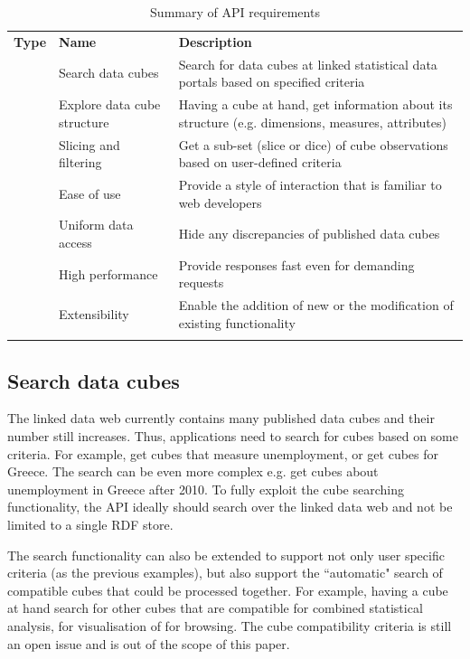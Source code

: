 \documentclass{llncs}
\begin{document}
\begin{table}
\caption{Summary of API requirements}
\begin{tabular}{p{2cm}p{4cm}p{5.9cm}}
\hline\noalign{\smallskip}
\textbf{Type} & \textbf{Name} & \textbf{Description}\\
\noalign{\smallskip}
\hline
\noalign{\smallskip}
\multirow{3}{*}{functional} & Search data cubes & Search for data cubes at linked statistical data portals based on specified criteria\\\noalign{\smallskip}
 & Explore data cube structure & Having a cube at hand, get information about its structure (e.g. dimensions, measures, attributes)\\\noalign{\smallskip}
 & Slicing and filtering & Get a sub-set (slice or dice) of cube observations based on user-defined criteria\\\noalign{\smallskip}\hline
\multirow{4}{*}{non-functional} & Ease of use & Provide a style of interaction that is familiar to web developers\\\noalign{\smallskip}
 & Uniform data access & Hide any discrepancies of published data cubes\\\noalign{\smallskip}
 & High performance & Provide responses fast even for demanding requests\\\noalign{\smallskip}
 & Extensibility & Enable the addition of new or the modification of existing functionality\\\noalign{\smallskip}
\hline
\end{tabular}
\label{tbl:req}
\end{table}

\subsection{Search data cubes}\label{sec:search}

The linked data web currently contains many published data cubes and their number still increases. Thus, applications need to search for cubes based on some criteria. For example, get cubes that measure unemployment, or get cubes for Greece. The search can be even more complex e.g. get cubes about unemployment in Greece after 2010. To fully exploit the cube searching functionality, the API ideally should search over the linked data web and not be limited to a single RDF store.

The search functionality can also be extended to support not only user specific criteria (as the previous examples), but also support the ``automatic" search of compatible cubes that could be processed together. For example, having a cube at hand search for other cubes that are compatible for combined statistical analysis, for visualisation of for browsing. The cube compatibility criteria is still an open issue and is out of the scope of this paper. 
\end{document}
